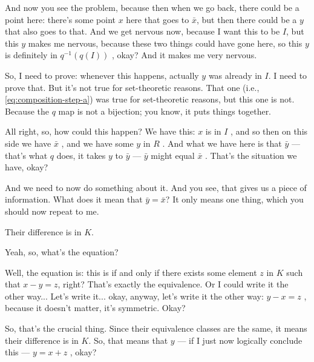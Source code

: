 \begin{proofWrapper}
\begin{speech}[00:32:06 - 00:34:06]
And now you see the problem, because then when we go back, there could be a point here: there's some point $x$ here that goes to $\bar{x}$, but then there could be a $y$ that also goes to that. And we get nervous now, because I want this to be $I$, but this $y$ makes me nervous, because these two things could have gone here, so this $y$ is definitely in $q^{-1}(q(I))$ , okay? And it makes me very nervous.

So, I need to prove: whenever this happens, actually $y$ was already in $I$. I need to prove that. But it's not true for set-theoretic reasons. That one (i.e., \cref{eq:composition-step-a}) was true for set-theoretic reasons, but this one is not. Because the $q$ map is not a bijection; you know, it puts things together.
\end{speech}

\begin{speech}[00:34:06 - 00:34:45]
All right, so, how could this happen? We have this: $x$ is in $I$ , and so then on this side we have $\bar{x}$ , and we have some $y$ in $R$ . And what we have here is that $\bar{y}$ --- that's what $q$ does, it takes $y$ to $\bar{y}$ --- $\bar{y}$ might equal $\bar{x}$ . That's the situation we have, okay?

And we need to now do something about it. And you see, that gives us a piece of information. What does it mean that $\bar{y} = \bar{x}$? It only means one thing, which you should now repeat to me.
\end{speech}

\begin{student}
Their difference is in $K$.
\end{student}

\begin{speech}[00:34:49 - 00:36:36]
Yeah, so, what's the equation? 

Well, the equation is: this is if and only if there exists some element $z$ in $K$ such that $x - y = z$, right?  That's exactly the equivalence. Or I could write it the other way... Let's write it... okay, anyway, let's write it the other way: $y - x = z$ , because it doesn't matter, it's symmetric. Okay?

So, that's the crucial thing. Since their equivalence classes are the same, it means their difference is in $K$. So, that means that $y$ --- if I just now logically conclude this --- $y = x + z$ , okay?


\end{speech}
\end{proofWrapper}
